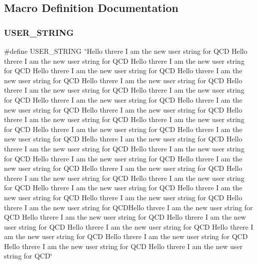 \subsection{Macro Definition Documentation}
\mbox{\label{adat-devel_2other__libs_2filedb_2src_2SConfCreateTest_8cpp_a5fdc86a0c07ccece3ef65e2f46c0ffd4}} 
\subsubsection{\texorpdfstring{USER\_STRING}{USER\_STRING}}
{\footnotesize\ttfamily \#define U\+S\+E\+R\+\_\+\+S\+T\+R\+I\+NG~\char`\"{}Hello threre I am the new user string for Q\+CD Hello threre I am the new user string for Q\+CD Hello threre I am the new user string for Q\+CD Hello threre I am the new user string for Q\+CD Hello threre I am the new user string for Q\+CD Hello threre I am the new user string for Q\+CD Hello threre I am the new user string for Q\+CD Hello threre I am the new user string for Q\+CD Hello threre I am the new user string for Q\+CD Hello threre I am the new user string for Q\+CD Hello threre I am the new user string for Q\+CD Hello threre I am the new user string for Q\+CD Hello threre I am the new user string for Q\+CD Hello threre I am the new user string for Q\+CD Hello threre I am the new user string for Q\+CD Hello threre I am the new user string for Q\+CD Hello threre I am the new user string for Q\+CD Hello threre I am the new user string for Q\+CD Hello threre I am the new user string for Q\+CD Hello threre I am the new user string for Q\+CD Hello threre I am the new user string for Q\+CD Hello threre I am the new user string for Q\+CD Hello threre I am the new user string for Q\+CD Hello threre I am the new user string for Q\+CD Hello threre I am the new user string for Q\+CD Hello threre I am the new user string for Q\+CD Hello threre I am the new user string for Q\+C\+D\+Hello threre I am the new user string for Q\+CD  Hello threre I am the new user string for Q\+CD Hello threre I am the new user string for Q\+CD Hello threre I am the new user string for Q\+CD Hello threre I am the new user string for Q\+CD Hello threre I am the new user string for Q\+CD Hello threre I am the new user string for Q\+CD Hello threre I am the new user string for Q\+CD\char`\"{}}



